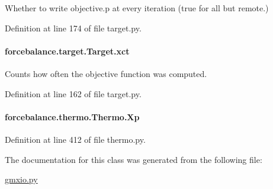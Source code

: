 Whether to write objective.\-p at every iteration (true for all but remote.) 



Definition at line 174 of file target.\-py.

\hypertarget{classforcebalance_1_1target_1_1Target_aad2e385cfbf7b4a68f1c2cb41133fe82}{
\paragraph[{xct}]{\setlength{\rightskip}{0pt plus 5cm}forcebalance.\-target.\-Target.\-xct\hspace{0.3cm}{\ttfamily [inherited]}}}\label{classforcebalance_1_1target_1_1Target_aad2e385cfbf7b4a68f1c2cb41133fe82}


Counts how often the objective function was computed. 



Definition at line 162 of file target.\-py.

\hypertarget{classforcebalance_1_1thermo_1_1Thermo_a5d5c7cfd9aa3bbd85ff15cb476ba990b}{
\paragraph[{Xp}]{\setlength{\rightskip}{0pt plus 5cm}forcebalance.\-thermo.\-Thermo.\-Xp\hspace{0.3cm}{\ttfamily [inherited]}}}\label{classforcebalance_1_1thermo_1_1Thermo_a5d5c7cfd9aa3bbd85ff15cb476ba990b}


Definition at line 412 of file thermo.\-py.



The documentation for this class was generated from the following file\-:\begin{DoxyCompactItemize}
\item 
\hyperlink{gmxio_8py}{gmxio.\-py}\end{DoxyCompactItemize}
